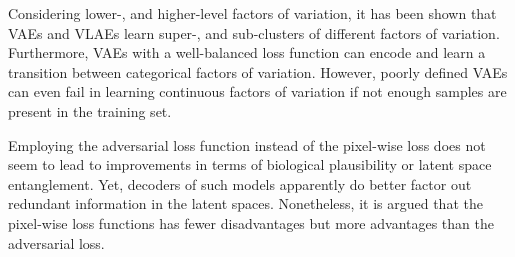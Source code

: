 Considering lower-, and higher-level factors of variation, it has been shown that \acp{VAE} and \acp{VLAE} learn super-, and sub-clusters of different factors of variation.
Furthermore, \acp{VAE} with a well-balanced loss function can encode and learn a transition between categorical factors of variation.
However, poorly defined \acp{VAE} can even fail in learning continuous factors of variation if not enough samples are present in the training set.

Employing the adversarial loss function instead of the pixel-wise loss does not seem to lead to improvements in terms of biological plausibility or latent space entanglement.
Yet, decoders of such models apparently do better factor out redundant information in the latent spaces.
Nonetheless, it is argued that the pixel-wise loss functions has fewer disadvantages but more advantages than the adversarial loss.